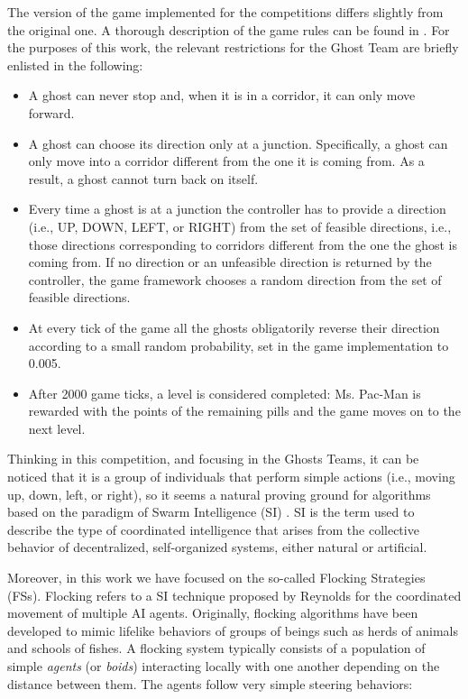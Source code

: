 \documentclass[a4paper]{llncs}
\begin{document}
The version of the game implemented for the competitions differs slightly from the original one. A thorough description of the game rules can be found in \cite{MsPacManVSGhost2011}. For the purposes of this work, the relevant restrictions for the Ghost Team are briefly enlisted in the following:
\begin{itemize}
  \item A ghost can never stop and, when it is in a corridor, it can only move forward.
  \item A ghost can choose its direction only at a junction. Specifically, a ghost can only move into a corridor different from the one it is coming from. As a result, a ghost cannot turn back on itself.
  \item Every time a ghost is at a junction the controller has to provide a direction (i.e., UP, DOWN, LEFT, or RIGHT) from the set of feasible directions, i.e., those directions corresponding to corridors different from the one the ghost is coming from. If no direction or an unfeasible direction is returned by the controller, the game framework chooses a random direction from the set of feasible directions.
  \item At every tick of the game all the ghosts obligatorily reverse their direction according to a small random probability, set in the game implementation to 0.005.
  \item After 2000 game ticks, a level is considered completed: Ms. Pac-Man is rewarded with the points of the remaining pills and the game moves on to the next level.
\end{itemize}

Thinking in this competition, and focusing in the Ghosts Teams, it can be noticed that it is a group of individuals that perform simple actions (i.e., moving up, down, left, or right), so it seems a natural proving ground for algorithms based on the paradigm of Swarm Intelligence (SI) \cite{BeniWang89}. SI is the term used to describe the type of coordinated intelligence that arises from the collective behavior of decentralized, self-organized systems, either natural or artificial.

Moreover, in this work we have focused on the so-called Flocking Strategies (FSs). Flocking refers to a SI technique proposed by Reynolds \cite{Reynolds87} for the coordinated movement of multiple AI agents. Originally, flocking algorithms have been developed to mimic lifelike behaviors of groups of beings such as herds of animals and schools of fishes. A flocking system typically consists of a population of simple \textit{agents} (or \textit{boids}) interacting locally with one another depending on the distance between them. The agents follow very simple steering behaviors:
\end{document}
